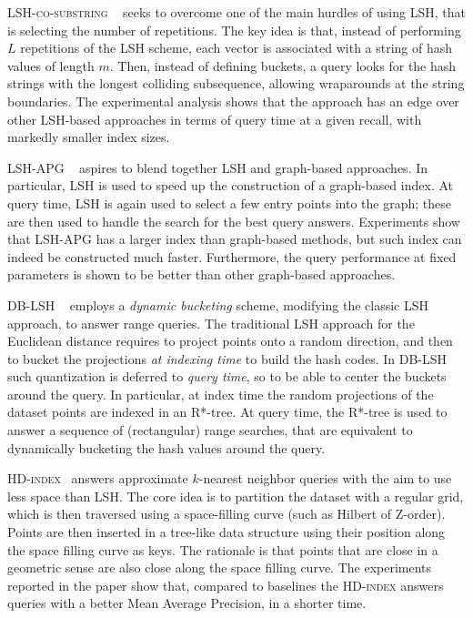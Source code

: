 \documentclass[11pt]{article}
\begin{document}
\textsc{LSH-co-substring}
~\cite{DBLP:conf/sigmod/LeiHKT20}
seeks to overcome one of the main hurdles of using LSH, that is selecting
the number of repetitions. The key idea is that, instead of performing
$L$ repetitions of the LSH scheme, each vector is associated with a
string of hash values of length $m$. Then, instead of defining buckets, a
query looks for the hash strings with the longest colliding subsequence,
allowing wraparounds at the string boundaries. The experimental analysis
shows that the approach has an edge over other LSH-based approaches in
terms of query time at a given recall, with markedly smaller index sizes.


\textsc{LSH-APG}
~\cite{DBLP:journals/pvldb/ZhaoTHZZ23} aspires to blend together LSH
and graph-based approaches. In particular, LSH is used to speed up the
construction of a graph-based index. At query time, LSH is again used
to select a few entry points into the graph; these are then used to
handle the search for the best query answers. Experiments show that
LSH-APG has a larger index than graph-based methods, but such index can
indeed be constructed much faster. Furthermore, the query performance at
fixed parameters is shown to be better than other graph-based approaches.

\textsc{DB-LSH}
~\cite{DBLP:conf/icde/TianZZ22}
employs a \emph{dynamic bucketing} scheme, modifying the classic LSH
approach, to answer range queries. The traditional LSH approach for the
Euclidean distance requires to project points onto a random direction,
and then to bucket the projections \emph{at indexing time} to build the
hash codes. In \textsc{DB-LSH} such quantization is deferred to
\emph{query time}, so to be able to center the buckets around the query.
In particular, at index time the random projections of the dataset points
are indexed in an R*-tree. At query time, the R*-tree is used to
answer a sequence of (rectangular) range searches, that are equivalent to
dynamically bucketing the hash values around the query.

\textsc{HD-index}~\cite{DBLP:journals/pvldb/AroraSK018} answers
approximate $k$-nearest neighbor queries with the aim to use less space
than LSH. The core idea is to partition the dataset with a regular grid,
which is then traversed using a space-filling curve (such as Hilbert of
Z-order). Points are then inserted in a tree-like data structure using
their position along the space filling curve as keys. The rationale
is that points that are close in a geometric sense are also close along
the space filling curve. The experiments reported in the paper show that,
compared to baselines
the \textsc{HD-index} answers queries with a
better Mean Average Precision, in a shorter time.
\end{document}
